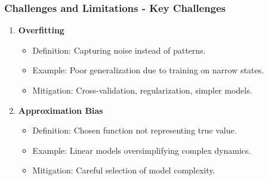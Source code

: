 \documentclass[aspectratio=169]{beamer}
\begin{document}
\begin{frame}[fragile]
  \frametitle{Challenges and Limitations - Key Challenges}
  
  \begin{enumerate}
    \item \textbf{Overfitting}
      \begin{itemize}
        \item Definition: Capturing noise instead of patterns.
        \item Example: Poor generalization due to training on narrow states.
        \item Mitigation: Cross-validation, regularization, simpler models.
      \end{itemize}
    
    \item \textbf{Approximation Bias}
      \begin{itemize}
        \item Definition: Chosen function not representing true value.
        \item Example: Linear models oversimplifying complex dynamics.
        \item Mitigation: Careful selection of model complexity.
      \end{itemize}
  \end{enumerate}
\end{frame}
\end{document}
